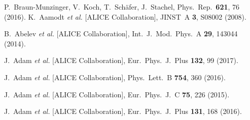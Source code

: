\documentclass[10pt]{article}
\def\Acknowledgements{\bigskip  \bigskip \begin{center} \begin{large}
             \bf ACKNOWLEDGEMENTS \end{large}\end{center}}
\begin{document}
 




\begin{thebibliography}{99}


P.~Braun-Munzinger, V.~Koch, T.~Sch\"afer, J.~Stachel,
Phys.\ Rep.\ {\bf 621}, 76 (2016).
  K.~Aamodt {\it et al.}  [ALICE Collaboration],
  JINST\ A {\bf 3}, S08002 (2008).

  B.~Abelev {\it et al.}  [ALICE Collaboration],
  Int.\ J.\ Mod.\ Phys.\ A {\bf 29}, 143044 (2014).
  
  J.~Adam {\it et al.}  [ALICE Collaboration],
Eur.\ Phys.\  J.\ Plus {\bf 132}, 99 (2017). 

  J.~Adam {\it et al.}  [ALICE Collaboration],
 Phys.\ Lett.\ B {\bf 754}, 360 (2016).

J.~Adam  {\it et al.}  [ALICE Collaboration],
Eur.\ Phys.\  J.\ C {\bf 75}, 226 (2015). 
 
J.~Adam  {\it et al.}  [ALICE Collaboration],
Eur.\ Phys.\  J.\ Plus {\bf 131}, 168 (2016). 



\end{thebibliography}

 
\end{document}

